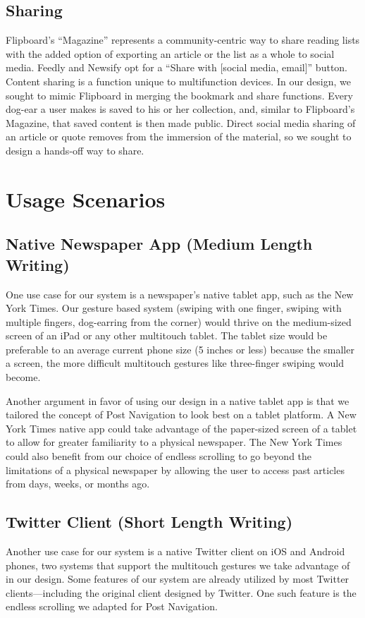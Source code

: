 \documentclass[11pt, oneside]{article}   	%
\begin{document}
\subsection{Sharing}
Flipboard's ``Magazine'' represents a community-centric way to share reading lists with the added option of exporting an article or the list as a whole to social media. Feedly and Newsify opt for a ``Share with [social media, email]'' button. Content sharing is a function unique to multifunction devices. In our design, we sought to mimic Flipboard in merging the bookmark and share functions. Every dog-ear a user makes is saved to his or her collection, and, similar to Flipboard's Magazine, that saved content is then made public. Direct social media sharing of an article or quote removes from the immersion of the material, so we sought to design a hands-off way to share.

\section{Usage Scenarios}
\subsection{Native Newspaper App (Medium Length Writing)}
One use case for our system is a newspaper's native tablet app, such as the New York Times. Our gesture based system (swiping with one finger, swiping with multiple fingers, dog-earring from the corner) would thrive on the medium-sized screen of an iPad or any other multitouch tablet. The tablet size would be preferable to an average current phone size (5 inches or less) because the smaller a screen, the more difficult multitouch gestures like three-finger swiping would become.

Another argument in favor of using our design in a native tablet app is that we tailored the concept of Post Navigation to look best on a tablet platform. A New York Times native app could take advantage of the paper-sized screen of a tablet to allow for greater familiarity to a physical newspaper. The New York Times could also benefit from our choice of endless scrolling to go beyond the limitations of a physical newspaper by allowing the user to access past articles from days, weeks, or months ago.

\subsection{Twitter Client (Short Length Writing)}
Another use case for our system is a native Twitter client on iOS and Android phones, two systems that support the multitouch gestures we take advantage of in our design. Some features of our system are already utilized by most Twitter clients---including the original client designed by Twitter. One such feature is the endless scrolling we adapted for Post Navigation. 
\end{document}

